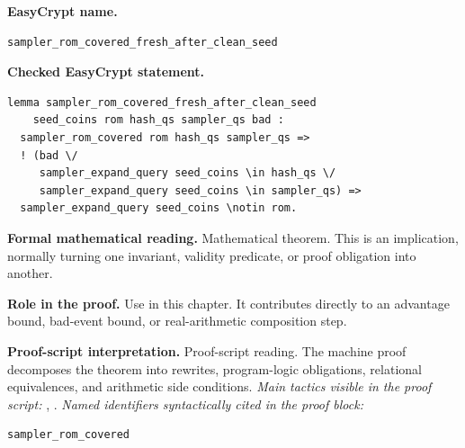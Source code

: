 \begin{formaltheorem}
\noindent\textbf{EasyCrypt name.}
\begin{lstlisting}[language=EasyCrypt,basicstyle=\ttfamily\scriptsize]
sampler_rom_covered_fresh_after_clean_seed
\end{lstlisting}
\noindent\textbf{Checked EasyCrypt statement.}
\begin{lstlisting}[language=EasyCrypt,basicstyle=\ttfamily\scriptsize]
lemma sampler_rom_covered_fresh_after_clean_seed
    seed_coins rom hash_qs sampler_qs bad :
  sampler_rom_covered rom hash_qs sampler_qs =>
  ! (bad \/
     sampler_expand_query seed_coins \in hash_qs \/
     sampler_expand_query seed_coins \in sampler_qs) =>
  sampler_expand_query seed_coins \notin rom.
\end{lstlisting}
\noindent\textbf{Formal mathematical reading.}
Mathematical theorem. This is an implication, normally turning one invariant, validity predicate, or proof obligation into another.

\noindent\textbf{Role in the proof.}
Use in this chapter. It contributes directly to an advantage bound, bad-event bound, or real-arithmetic composition step.

\noindent\textbf{Proof-script interpretation.}
Proof-script reading. The machine proof decomposes the theorem into rewrites, program-logic obligations, relational equivalences, and arithmetic side conditions.
\emph{Main tactics visible in the proof script:} , .
\emph{Named identifiers syntactically cited in the proof block:}
\begin{lstlisting}[language=EasyCrypt,basicstyle=\ttfamily\scriptsize]
sampler_rom_covered
\end{lstlisting}

\end{formaltheorem}

